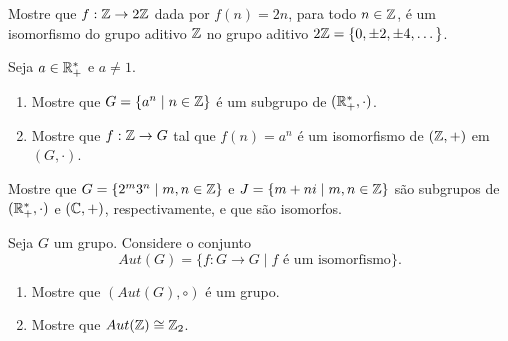 \documentclass[12pt]{exam}
\begin{document}
    \vspace{.3cm}

    \questao{} Mostre que $f : \mathbb{Z} \to 2\mathbb{Z}$ dada por $f(n) = 2n$, para todo $n \in \mathbb{Z}$, \'e um isomorfismo do grupo aditivo $\mathbb{Z}$ no grupo aditivo $2\mathbb{Z} = \{0, \pm 2, \pm 4, \dots\}$.

    \vspace{.3cm}

    \questao{} Seja $a \in \mathbb{R}_+^*$ e $a \ne 1$.
    \begin{enumerate}[label=({\alph*})]
      \item  Mostre que $G = \{a^n \mid n \in \mathbb{Z}\}$ \'e um subgrupo de $(\mathbb{R}_+^*, \cdot)$.

      \item Mostre que $f : \mathbb{Z} \to G$ tal que $f(n) = a^n$ \'e um isomorfismo de $(\mathbb{Z}, +)$ em $(G, \cdot)$.
    \end{enumerate}

    \vspace{.3cm}

    \questao{} Mostre que $G = \{2^m3^n \mid m, n \in \mathbb{Z}\}$ e $J = \{m + ni \mid m, n \in \mathbb{Z}\}$ s\~ao subgrupos de $(\mathbb{R}_+^*, \cdot)$ e $(\mathbb{C}, +)$, respectivamente, e que s\~ao isomorfos.

    \newpage

    \questao{} Seja $G$ um grupo. Considere o conjunto
    \[
        Aut(G) = \{f : G \to G \mid f \mbox{ \'e um isomorfismo}\}.
    \]
    \begin{enumerate}[label=({\alph*})]
      \item Mostre que $(Aut(G), \circ)$ \'e um grupo.

      \item Mostre que $Aut(\mathbb{Z}) \cong \mathbb{Z}_2$.
    \end{enumerate}

    \vspace{.3cm}
\end{document}
